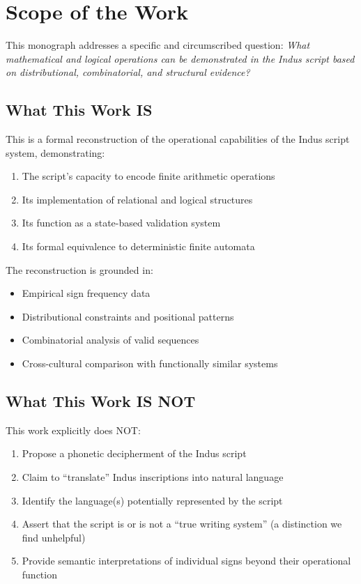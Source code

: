 \section{Scope of the Work}

This monograph addresses a specific and circumscribed question: \emph{What mathematical and logical operations can be demonstrated in the Indus script based on distributional, combinatorial, and structural evidence?}

\subsection{What This Work IS}

This is a formal reconstruction of the operational capabilities of the Indus script system, demonstrating:

\begin{enumerate}
    \item The script's capacity to encode finite arithmetic operations
    \item Its implementation of relational and logical structures
    \item Its function as a state-based validation system
    \item Its formal equivalence to deterministic finite automata
\end{enumerate}

The reconstruction is grounded in:
\begin{itemize}
    \item Empirical sign frequency data
    \item Distributional constraints and positional patterns
    \item Combinatorial analysis of valid sequences
    \item Cross-cultural comparison with functionally similar systems
\end{itemize}

\subsection{What This Work IS NOT}

This work explicitly does NOT:

\begin{enumerate}
    \item Propose a phonetic decipherment of the Indus script
    \item Claim to ``translate'' Indus inscriptions into natural language
    \item Identify the language(s) potentially represented by the script
    \item Assert that the script is or is not a ``true writing system'' (a distinction we find unhelpful)
    \item Provide semantic interpretations of individual signs beyond their operational function
\end{enumerate}

